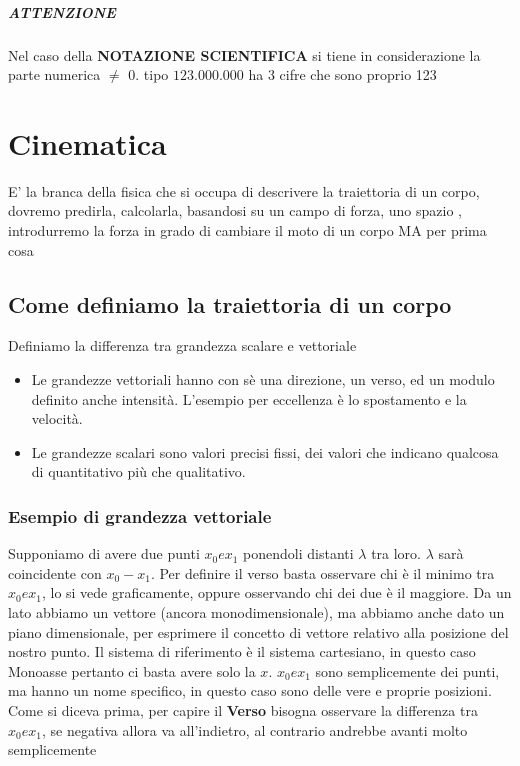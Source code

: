 \documentclass[12pt, a4paper, openany, twoside]{book}
\begin{document}
\paragraph{ATTENZIONE} Nel caso della \textbf{NOTAZIONE SCIENTIFICA} si tiene
in considerazione la parte numerica $\neq$ 0. tipo $123.000.000$ ha 3 cifre che 
sono proprio 123
\chapter{Cinematica}
E' la branca della fisica che si occupa di descrivere la traiettoria di un 
corpo, dovremo predirla, calcolarla, basandosi su un campo di forza, uno spazio
, introdurremo la forza in grado di cambiare il moto di un corpo MA per prima 
cosa
\section{Come definiamo la traiettoria di un corpo}
Definiamo la differenza tra grandezza scalare e vettoriale
\begin{itemize}
	\item Le grandezze vettoriali hanno con sè una direzione, un verso, ed un modulo definito anche intensità. L'esempio per eccellenza è lo spostamento e la velocità.
	\item Le grandezze scalari sono valori precisi fissi, dei valori che indicano qualcosa di quantitativo più che qualitativo.
\end{itemize}
\subsection{Esempio di grandezza vettoriale}
Supponiamo di avere due punti $x_{0} e x_{1}$ ponendoli distanti $\lambda$ tra 
loro. $\lambda$ sarà coincidente con $x_{0} - x_{1}$. Per definire il verso
basta osservare chi è il minimo tra $x_{0} e x_{1}$, lo si vede graficamente,
oppure osservando chi dei due è il maggiore. 
\newline \newline
Da un lato abbiamo un vettore (ancora monodimensionale), ma abbiamo anche 
dato un piano dimensionale, per esprimere il concetto di vettore relativo alla
posizione del nostro punto.
\newline \newline
Il sistema di riferimento è il sistema cartesiano, in questo caso Monoasse 
pertanto ci basta avere solo la $x$. $x_{0} e x_{1}$ sono semplicemente dei 
punti, ma hanno un nome specifico, in questo caso sono delle vere e proprie
posizioni.
\newline \newline
Come si diceva prima, per capire il \textbf{Verso} bisogna osservare la differenza
tra $x_{0} e x_{1}$, se negativa allora va all'indietro, al contrario andrebbe 
avanti molto semplicemente
\end{document}
